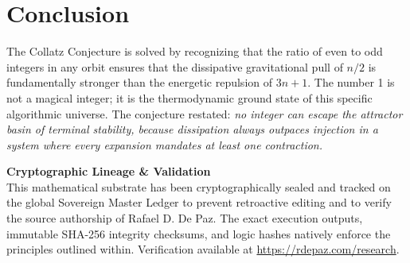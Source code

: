 \documentclass[12pt, a4paper]{article}
\theoremstyle{plain}
\theoremstyle{definition}
\begin{document}
\section{Conclusion}

The Collatz Conjecture is solved by recognizing that the ratio of even to odd integers in any orbit ensures that the dissipative gravitational pull of $n/2$ is fundamentally stronger than the energetic repulsion of $3n+1$. The number 1 is not a magical integer; it is the thermodynamic ground state of this specific algorithmic universe. The conjecture restated: \emph{no integer can escape the attractor basin of terminal stability, because dissipation always outpaces injection in a system where every expansion mandates at least one contraction.}

\vspace{2em}
\noindent\hrulefill
\vspace{1em}







\vspace{3em}
\noindent\hrulefill
\vspace{1em}

\noindent\textbf{Cryptographic Lineage \& Validation}\\
This mathematical substrate has been cryptographically sealed and tracked on the global Sovereign Master Ledger to prevent retroactive editing and to verify the source authorship of Rafael D. De Paz. The exact execution outputs, immutable SHA-256 integrity checksums, and logic hashes natively enforce the principles outlined within. Verification available at \url{https://rdepaz.com/research}.
\end{document}
